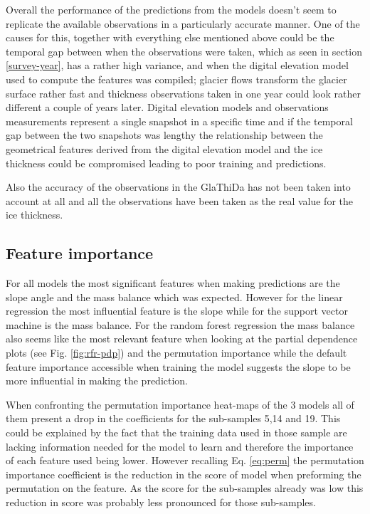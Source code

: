 Overall the performance of the predictions from the models doesn't seem to replicate the available observations in a particularly accurate manner. One of the causes for this, together with everything else mentioned above could be the temporal gap between when the observations were taken, which as seen in section \ref{survey-year}, has a rather high variance, and when the digital elevation model used to compute the features was compiled; glacier flows transform the glacier surface rather fast and thickness observations taken in one year could look rather different a couple of years later. Digital elevation models and observations measurements represent a single snapshot in a specific time and if the temporal gap between the two snapshots was lengthy the relationship between the geometrical features derived from the digital elevation model and the ice thickness could be compromised leading to poor training and predictions.

Also the accuracy of the observations in the GlaThiDa has not been taken into account at all and all the observations have been taken as the real value for the ice thickness.

\subsection{Feature importance}\label{disc-features}
For all models the most significant features when making predictions are the slope angle and the mass balance which was expected. However for the linear regression the most influential feature is the slope while for the support  vector machine is the mass balance. For the random forest regression the mass balance also seems like the most relevant feature when looking at the partial dependence plots (see Fig. \ref{fig:rfr-pdp}) and the permutation importance while the default feature importance accessible when training the model suggests the slope to be more influential in making the prediction.

When confronting the permutation importance heat-maps of the 3 models all of them present a drop in the coefficients for the sub-samples 5,14 and 19. This could be explained by the fact that the training data used in those sample are lacking information needed for the model to learn and therefore the importance of each feature used being lower. However recalling Eq. \ref{eq:perm} the permutation importance coefficient is the reduction in the score of model when preforming the permutation on the feature. As the score for the sub-samples already was low this reduction in score was probably less pronounced for those sub-samples. 

